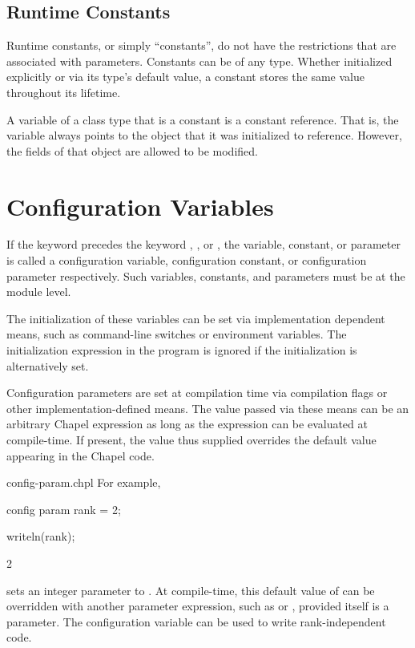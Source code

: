 \subsection{Runtime Constants}
\label{Runtime_Constants}

Runtime constants, or simply ``constants'', do not have the
restrictions that are associated with parameters.  Constants can be of
any type.  Whether initialized explicitly or via its type's default
value, a constant stores the same value throughout its lifetime.

A variable of a class type that is a constant is a constant reference.
That is, the variable always
points to the object that it was initialized to reference.
However, the fields of that object are allowed to be modified.

\section{Configuration Variables}
\label{Configuration_Variables}

If the keyword  precedes the
keyword , , or , the variable,
constant, or parameter is called a configuration variable,
configuration constant, or configuration parameter respectively.  Such
variables, constants, and parameters must be at the module level.

The initialization of these variables can be set via implementation
dependent means, such as command-line switches or environment
variables.  The initialization expression in the program is ignored if
the initialization is alternatively set.

Configuration parameters are set at compilation time via compilation
flags or other implementation-defined means.  The value passed via
these means can be an arbitrary Chapel expression as long as the
expression can be evaluated at compile-time.  If present, the value thus
supplied overrides the default value appearing in the Chapel code.

\begin{chapelexample}{config-param.chpl}
For example,
\begin{chapel}
config param rank = 2;
\end{chapel}
\begin{chapelnoprint}
writeln(rank);
\end{chapelnoprint}
\begin{chapeloutput}
2
\end{chapeloutput}
sets an integer parameter  to .
At compile-time, this default value of  can be overridden
with another parameter expression, such as  or ,
provided  itself is a parameter. The 
configuration variable can be used to write rank-independent code.
\end{chapelexample}

